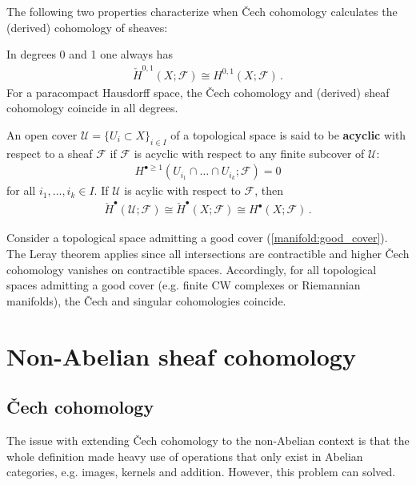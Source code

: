     The following two properties characterize when \v{C}ech cohomology calculates the (derived) cohomology of sheaves:
    \begin{property}
        In degrees 0 and 1 one always has
        \begin{gather}
            \check{H}^{0,1}(X;\mathcal{F})\cong H^{0,1}(X;\mathcal{F})\,.
        \end{gather}
        For a paracompact Hausdorff space, the \v{C}ech cohomology and (derived) sheaf cohomology coincide in all degrees.
    \end{property}
    \begin{property}[Leray]
        An open cover $\mathcal{U}=\{U_i\subset X\}_{i\in I}$ of a topological space is said to be \textbf{acyclic} with respect to a sheaf $\mathcal{F}$ if $\mathcal{F}$ is acyclic with respect to any finite subcover of $\mathcal{U}$:
        \begin{gather}
            H^{\bullet\geq1}(U_{i_1}\cap\ldots\cap U_{i_k};\mathcal{F})=0
        \end{gather}
        for all $i_1,\ldots,i_k\in I$. If $\mathcal{U}$ is acylic with respect to $\mathcal{F}$, then
        \begin{gather}
            \check{H}^\bullet(\mathcal{U};\mathcal{F})\cong\check{H}^\bullet(X;\mathcal{F})\cong H^\bullet(X;\mathcal{F})\,.
        \end{gather}
    \end{property}
    \begin{example}
        Consider a topological space admitting a good cover (\cref{manifold:good_cover}). The Leray theorem applies since all intersections are contractible and higher \v{C}ech cohomology vanishes on contractible spaces. Accordingly, for all topological spaces admitting a good cover (e.g. finite CW complexes or Riemannian manifolds), the \v{C}ech and singular cohomologies coincide.
    \end{example}

\section{Non-Abelian sheaf cohomology}
\subsection{\v{C}ech cohomology}

    The issue with extending \v{Cech} cohomology to the non-Abelian context is that the whole definition made heavy use of operations that only exist in Abelian categories, e.g. images, kernels and addition. However, this problem can solved.

